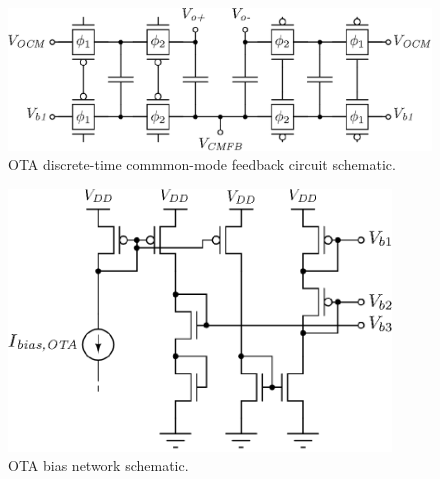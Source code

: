 \begin{figure}[!t]
	\centering
	\includegraphics[width=4.6in]{./Figures/Filter/CMFB_post.eps}
	\caption{OTA discrete-time commmon-mode feedback circuit schematic.}\label{fig:CMFB_post}
\end{figure}
\begin{figure}[!t]
	\centering
	\includegraphics[width=4in]{./Figures/Filter/bias_ota_post.eps}
	\caption{OTA bias network schematic.}\label{fig:bias_ota_post}
\end{figure}
